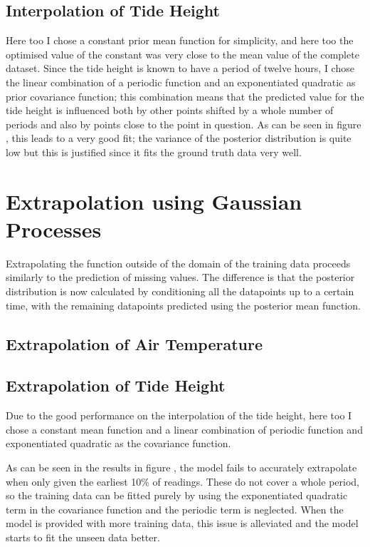 \documentclass{article}
\begin{document}
            \subsection{Interpolation of Tide Height}

                Here too I chose a constant prior mean function for simplicity, and here too the optimised value of the constant was very close to the mean value of the complete dataset. Since the tide height is known to have a period of twelve hours, I chose the linear combination of a periodic function and an exponentiated quadratic as prior covariance function; this combination means that the predicted value for the tide height is influenced both by other points shifted by a whole number of periods and also by points close to the point in question. As can be seen in figure %
                , this leads to a very good fit; the variance of the posterior distribution is quite low but this is justified since it fits the ground truth data very well.

    \section{Extrapolation using Gaussian Processes}

            Extrapolating the function outside of the domain of the training data proceeds similarly to the prediction of missing values. The difference is that the posterior distribution is now calculated by conditioning all the datapoints up to a certain time, with the remaining datapoints predicted using the posterior mean function.

            \subsection{Extrapolation of Air Temperature}



            \subsection{Extrapolation of Tide Height}

                Due to the good performance on the interpolation of the tide height, here too I chose a constant mean function and a linear combination of periodic function and exponentiated quadratic as the covariance function.

                As can be seen in the results in figure %
                , the model fails to accurately extrapolate when only given the earliest 10\% of readings. These do not cover a whole period, so the training data can be fitted purely by using the exponentiated quadratic term in the covariance function and the periodic term is neglected. When the model is provided with more training data, this issue is alleviated and the model starts to fit the unseen data better. 
\end{document}
